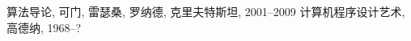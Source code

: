 \begin{thebibliography}{10}
算法导论, 可门, 雷瑟桑, 罗纳德, 克里夫特斯坦, 2001--2009
计算机程序设计艺术, 高德纳, 1968--?
\end{thebibliography}
